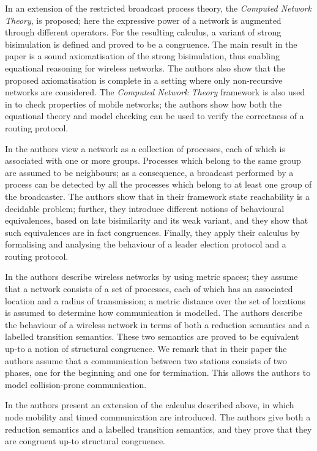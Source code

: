 \documentclass{LMCS}
\begin{document}
In \cite{GwFM10} an extension of the restricted broadcast process theory, 
the \emph{Computed Network Theory}, is proposed; here the expressive power of a network 
is augmented through different operators. 
For the resulting calculus, a variant of strong bisimulation is 
defined and proved to be a congruence. The main result in the paper is a sound 
axiomatisation of the strong bisimulation, thus 
enabling equational reasoning for wireless networks. The authors 
also show that the proposed axiomatisation is complete in a setting 
where only non-recursive networks are considered.
The \emph{Computed Network Theory} framework is also used in 
\cite{wfmodcheck} to check properties of mobile networks; 
the authors show how both the equational theory and model checking 
can be used to verify the correctness of a routing protocol.

In \cite{omegacalc} the authors view a network as a collection of 
processes, each of which is associated with one or more groups. 
Processes which belong to the same group are assumed to be 
neighbours; as a consequence, a broadcast performed by a 
process can be detected by all the processes which belong 
to at least one group of the broadcaster. 
The authors show that in their framework state reachability is 
a decidable problem; further, they introduce different notions 
of behavioural equivalences, based on late bisimilarity and its weak 
variant, and they show that such equivalences are in fact congruences.
Finally, they apply their calculus by formalising and analysing the 
behaviour of a leader election protocol and 
a routing protocol.

In \cite{LaneseS10} the authors describe wireless 
networks by using metric spaces; they assume that a network consists 
of a set of processes, each of which has an associated location 
and a radius of transmission; a metric distance over the set of locations 
is assumed to determine how communication is modelled. The authors 
describe the behaviour of a wireless network in terms of both a 
reduction semantics and a labelled transition semantics. These 
two semantics are proved to be equivalent up-to a notion of 
structural congruence. We remark that in their paper the authors 
assume that a communication between two stations consists of 
two phases, one for the beginning and one for termination. 
This allows the authors to model collision-prone communication. 

In \cite{wang} the authors present an extension of the calculus described above, 
in which node mobility and timed communication are introduced. The 
authors give both a reduction semantics and a labelled transition semantics, 
and they prove that they are congruent up-to structural congruence.
\end{document}
